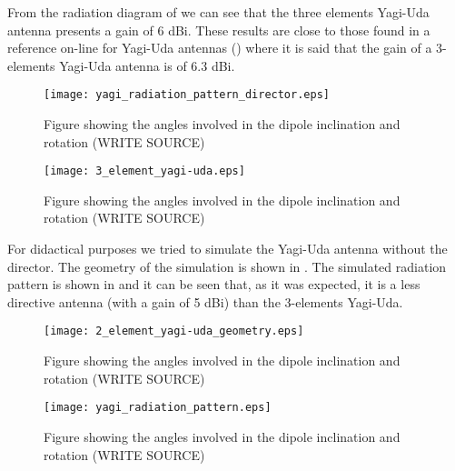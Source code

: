From the radiation diagram of  we can see that the three elements Yagi-Uda antenna presents a gain of 6 dBi. These results are close to those found in a reference on-line for Yagi-Uda antennas () where it is said that the gain of a 3-elements Yagi-Uda antenna is of 6.3 dBi.

\begin{figure}[!h]
  \centering
  \texttt{[image: yagi\_radiation\_pattern\_director.eps]}
  \caption{Figure showing the angles involved in the dipole inclination and rotation (WRITE SOURCE)}
  \label{fig:yagi_radiation_pattern_director}
\end{figure}

\begin{figure}[!h]
  \centering
  \texttt{[image: 3\_element\_yagi-uda.eps]}
  \caption{Figure showing the angles involved in the dipole inclination and rotation (WRITE SOURCE)}
  \label{fig:3_element_yagi-uda}
\end{figure}

For didactical purposes we tried to simulate the Yagi-Uda antenna without the director. The geometry of the simulation is shown in . The simulated radiation pattern is shown in  and it can be seen that, as it was expected, it is a less directive antenna (with a gain of 5 dBi) than the 3-elements Yagi-Uda.

\begin{figure}[!h]
  \centering
  \texttt{[image: 2\_element\_yagi-uda\_geometry.eps]}
  \caption{Figure showing the angles involved in the dipole inclination and rotation (WRITE SOURCE)}
  \label{fig:2_element_yagi-uda_geometry}
\end{figure}

\begin{figure}[!h]
  \centering
  \texttt{[image: yagi\_radiation\_pattern.eps]}
  \caption{Figure showing the angles involved in the dipole inclination and rotation (WRITE SOURCE)}
  \label{fig:yagi_radiation_pattern}
\end{figure}
